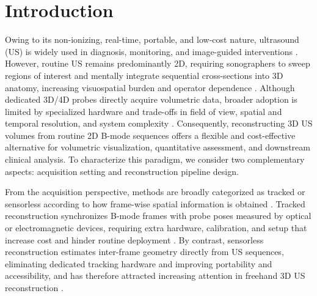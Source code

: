 \vspace{-6mm}
\section{Introduction}
\label{sec:introduction}

Owing to its non-ionizing, real-time, portable, and low-cost nature, ultrasound
(US) is widely used in diagnosis, monitoring, and image-guided interventions
\cite{tsedendambaReviewLinearArray2025}.
However, routine US remains predominantly 2D, requiring sonographers to sweep
regions of interest and mentally integrate sequential cross-sections into 3D
anatomy, increasing visuospatial burden and operator dependence
\cite{tenajasRecentAdvancesAI2023}.
Although dedicated 3D/4D probes directly acquire volumetric data, broader
adoption is limited by specialized hardware and trade-offs in field of view,
spatial and temporal resolution, and system complexity
\cite{ingramThreeDimensionalUltrasound2025}.
Consequently, reconstructing 3D US volumes from routine 2D B-mode sequences
offers a flexible and cost-effective alternative for volumetric visualization,
quantitative assessment, and downstream clinical analysis.
To characterize this paradigm, we consider two complementary aspects:
acquisition setting and reconstruction pipeline design.

From the acquisition perspective, methods are broadly categorized as tracked or
sensorless according to how frame-wise spatial information is obtained
\cite{adriaansTrackerless3DFreehand2024}.
Tracked reconstruction synchronizes B-mode frames with probe poses measured by
optical or electromagnetic devices, requiring extra hardware, calibration, and
setup that increase cost and hinder routine deployment
\cite{mozaffariFreehand3DUltrasound2017,
adriaansTrackerless3DFreehand2024}.
By contrast, sensorless reconstruction estimates inter-frame geometry directly
from US sequences, eliminating dedicated tracking hardware and improving
portability and accessibility, and has therefore attracted increasing attention
in freehand 3D US reconstruction
\cite{adriaansTrackerless3DFreehand2024,liTUSREC2024}.

